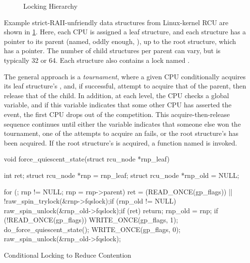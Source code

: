 \begin{figure}
\centering
{}
\caption{Locking Hierarchy}
\label{fig:locking:Locking Hierarchy}
\end{figure}

Example strict-RAII-unfriendly data structures from Linux-kernel RCU
are shown in
\cref{fig:locking:Locking Hierarchy}.
Here, each CPU is assigned a leaf  structure, and each
 structure has a pointer to its parent (named, oddly
enough, ), up to the root  structure,
which has a   pointer.
The number of child  structures per parent can vary,
but is typically 32 or 64.
Each  structure also contains a lock named .

The general approach is a \emph{tournament}, where
a given CPU conditionally acquires its
leaf  structure's , and, if successful,
attempt to acquire that of the parent, then release that of the child.
In addition, at each level, the CPU checks a global 
variable, and if this variable indicates that some other CPU has
asserted the event, the first CPU drops out of the competition.
This acquire-then-release sequence continues until either the
 variable indicates that someone else won the tournament,
one of the attempts to acquire an  fails, or
the root  structure's  has been acquired.
If the root  structure's  is acquired,
a function named  is invoked.

\begin{listing}
\begin{fcvlabel}
\begin{VerbatimL}[commandchars=\\\[\]]
void force_quiescent_state(struct rcu_node *rnp_leaf)
{
	int ret;
	struct rcu_node *rnp = rnp_leaf;
	struct rcu_node *rnp_old = NULL;

	for (; rnp != NULL; rnp = rnp->parent) {	\lnlbl[loop:b]
		ret = (READ_ONCE(gp_flags)) ||		
		       !raw_spin_trylock(&rnp->fqslock);\lnlbl[trylock]
		if (rnp_old != NULL)			
			raw_spin_unlock(&rnp_old->fqslock);\lnlbl[rel1]
		if (ret)				\lnlbl[giveup]
			return;				\lnlbl[return]
		rnp_old = rnp;				\lnlbl[save]
	}						\lnlbl[loop:e]
	if (!READ_ONCE(gp_flags)) {			
		WRITE_ONCE(gp_flags, 1);		
		do_force_quiescent_state();		\lnlbl[invoke]
		WRITE_ONCE(gp_flags, 0);		
	}
	raw_spin_unlock(&rnp_old->fqslock);		\lnlbl[rel2]
}
\end{VerbatimL}
\end{fcvlabel}
\caption{Conditional Locking to Reduce Contention}
\label{lst:locking:Conditional Locking to Reduce Contention}
\end{listing}

